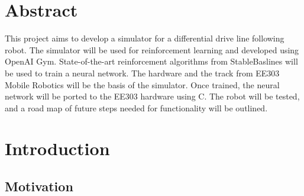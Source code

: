 \documentclass[12pt]{article}
\begin{document}
\clearpage

\bibdata



\section{Abstract}

This \cite{Malu} project aims to develop a simulator for a differential drive line following robot. The simulator will be used for reinforcement learning and developed using OpenAI Gym. State-of-the-art reinforcement algorithms from StableBaslines will be used to train a neural network. The hardware and the track from EE303 Mobile Robotics will be the basis of the simulator. Once trained, the neural network will be ported to the EE303 hardware using C. The robot will be tested, and a road map of future steps needed for functionality will be outlined.
\pagebreak



\tableofcontents


\pagebreak
\listoffigures
\pagebreak
\listoftables
\pagebreak

\section{Introduction}
\subsection{Motivation}
\end{document}
